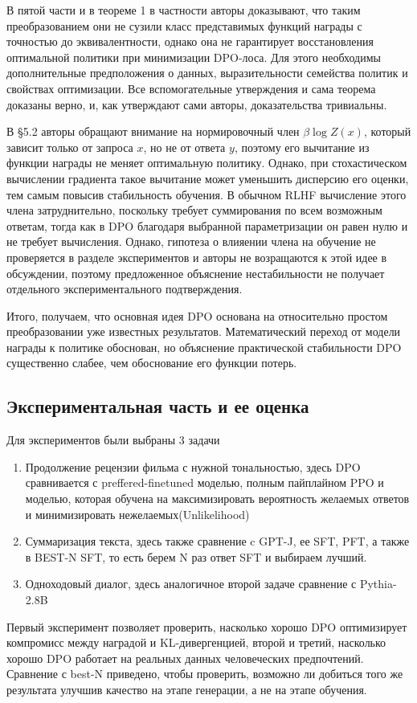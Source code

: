 \documentclass[11pt,a4paper]{article}
\theoremstyle{remark}
\begin{document}
В пятой части и в теореме 1 в частности авторы доказывают, что таким преобразованием они не сузили класс представимых функций награды с точностью до эквивалентности, однако она не гарантирует восстановления оптимальной политики при минимизации DPO-лоса. Для этого необходимы дополнительные предположения о данных, выразительности семейства политик и свойствах оптимизации.
Все вспомогательные утверждения и сама теорема доказаны верно, и, как утверждают сами авторы, доказательства тривиальны.
 
В \S 5.2 авторы обращают внимание на нормировочный член $\beta\log Z(x)$, который зависит только от запроса $x$, но не от ответа $y$, поэтому его вычитание из функции награды не меняет оптимальную политику. Однако, при стохастическом вычислении градиента такое вычитание может уменьшить дисперсию его оценки, тем самым повысив стабильность обучения. В обычном RLHF вычисление этого члена затруднительно, поскольку требует суммирования по всем возможным ответам, тогда как в DPO благодаря выбранной параметризации он равен нулю и не требует вычисления.
Однако, гипотеза о влияении члена на обучение не проверяется в разделе экспериментов и авторы не возращаются к этой идее в обсуждении, поэтому предложенное объяснение нестабильности не получает отдельного экспериментального подтверждения.

Итого, получаем, что основная идея DPO основана на относительно простом преобразовании уже известных результатов. Математический переход от модели награды к политике обоснован, но объяснение практической стабильности DPO существенно слабее, чем обоснование его функции потерь.

\subsection{Экспериментальная часть и ее оценка}
Для экспериментов были выбраны 3 задачи
\begin{enumerate}
    \item Продолжение рецензии фильма с нужной тональностью, здесь DPO сравнивается с preffered-finetuned моделью, полным пайплайном PPO и моделью, которая обучена на максимизировать вероятность желаемых ответов и минимизировать нежелаемых(Unlikelihood)
    \item Суммаризация текста, здесь также сравнение c GPT-J, ее SFT, PFT, а также в BEST-N SFT, то есть берем N раз ответ SFT и выбираем лучший.
    \item Одноходовый диалог, здесь аналогичное второй задаче сравнение с Pythia-2.8B
\end{enumerate}
Первый эксперимент позволяет проверить, насколько хорошо DPO оптимизирует компромисс между наградой и KL-дивергенцией, второй и третий, насколько хорошо DPO работает на реальных данных человеческих предпочтений.
Сравнение с best-N приведено, чтобы проверить, возможно ли добиться того же результата улучшив качество на этапе генерации, а не на этапе обучения.
\end{document}
